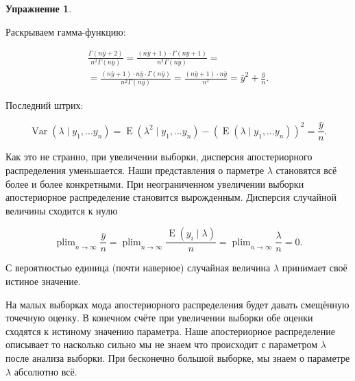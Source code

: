 \documentclass[12pt, a4paper, oneside]{extreport}
\DeclareMathOperator{\Var}{Var}
\DeclareMathOperator{\E}{\mathop{E}}
\DeclareMathOperator*{\plim}{plim}
\theoremstyle{plain}              %
\theoremstyle{definition}         %
\newtheorem{problem}{\color{myblue} Упражнение}
\begin{document}
\begin{problem}
\begin{sol}
Раскрываем гамма-функцию:

\begin{multline*}
 \frac{\Gamma(n \bar{y} + 2)}{n^2 \Gamma(n\bar y)} = \frac{(n \bar y + 1) \cdot \Gamma(n \bar y + 1)}{n^2 \Gamma(n \bar y)} = \\ =   \frac{(n \bar y + 1) \cdot n \bar y \cdot \Gamma(n \bar y)}{n^2 \Gamma(n \bar y)} = \frac{(n \bar y + 1) \cdot n \bar y}{n^2} = \bar{y}^2 + \frac{\bar y}{n}. 
\end{multline*}

Последний штрих:

\[ \Var(\lambda \mid y_1, \ldots y_n) = \E(\lambda^2 \mid y_1, \ldots y_n) - (\E(\lambda \mid y_1, \ldots y_n))^2 = \frac{\bar y}{n}.\]

Как это не странно, при увеличении выборки, дисперсия апостериорного распределения уменьшается. Наши представления о парметре $\lambda$ становятся всё более и более конкретными. При неограниченном увеличении выборки апостериорное распределение становится вырожденным. Дисперсия случайной величины сходится к нулю

\[\plim_{n \to \infty} \frac{\bar y}{n} =  \plim_{n \to \infty} \frac{\E(y_i \mid \lambda)}{n} = \plim_{n \to \infty} \frac{\lambda}{n} = 0.\]

С вероятностью единица (почти наверное) случайная величина $\lambda$ принимает своё истиное значение.

 На малых выборках мода апостериорного распределения будет давать смещённую точечную оценку.  В конечном счёте при увеличении выборки обе оценки сходятся к истиному значению параметра. Наше апостериорное распределение описывает то насколько сильно мы не знаем что происходит с параметром $\lambda$ после анализа выборки. При бесконечно большой выборке, мы знаем о параметре $\lambda$ абсолютно всё.  
\end{sol}
\end{problem}
\end{document}
